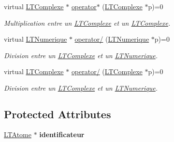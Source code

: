 \begin{DoxyCompactItemize}
virtual \hyperlink{class_l_t_complexe}{L\+T\+Complexe} $\ast$ \hyperlink{class_l_t_numerique_a6991c6c854915c7bfd98634c791ab815}{operator$\ast$} (\hyperlink{class_l_t_complexe}{L\+T\+Complexe} $\ast$p)=0
\begin{DoxyCompactList}\small\item\em Multiplication entre un \hyperlink{class_l_t_complexe}{L\+T\+Complexe} et un \hyperlink{class_l_t_complexe}{L\+T\+Complexe}. \end{DoxyCompactList}\item 
virtual \hyperlink{class_l_t_numerique}{L\+T\+Numerique} $\ast$ \hyperlink{class_l_t_numerique_ab3acc500e7c92b2d1e05ebc65561b84a}{operator/} (\hyperlink{class_l_t_numerique}{L\+T\+Numerique} $\ast$p)=0
\begin{DoxyCompactList}\small\item\em Division entre un \hyperlink{class_l_t_complexe}{L\+T\+Complexe} et un \hyperlink{class_l_t_numerique}{L\+T\+Numerique}. \end{DoxyCompactList}\item 
virtual \hyperlink{class_l_t_complexe}{L\+T\+Complexe} $\ast$ \hyperlink{class_l_t_numerique_a223402e5b15e25f716bdd1981f59f39d}{operator/} (\hyperlink{class_l_t_complexe}{L\+T\+Complexe} $\ast$p)=0
\begin{DoxyCompactList}\small\item\em Division entre un \hyperlink{class_l_t_complexe}{L\+T\+Complexe} et un \hyperlink{class_l_t_numerique}{L\+T\+Numerique}. \end{DoxyCompactList}\end{DoxyCompactItemize}
\subsection*{Protected Attributes}
\begin{DoxyCompactItemize}
\item 
\hyperlink{class_l_t_atome}{L\+T\+Atome} $\ast$ {\bfseries identificateur}\hypertarget{class_l_t_numerique_abf20a2e6d19ae6a01b1114fd15460174}{}\label{class_l_t_numerique_abf20a2e6d19ae6a01b1114fd15460174}

\end{DoxyCompactItemize}
